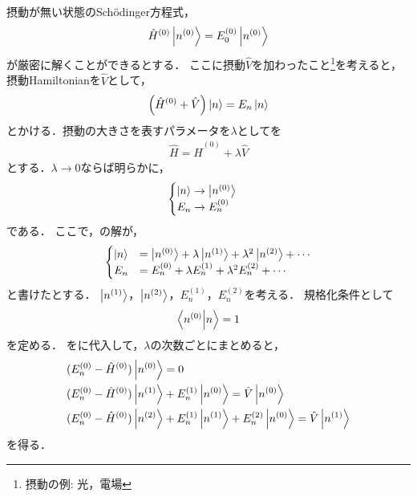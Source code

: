 \documentclass{report}
\begin{document}
  摂動が無い状態のSch\"odinger方程式，
  \begin{equation}
    \hat{H}^{(0)}\ket{n^{(0)}}=E_0^{(0)}\ket{n^{(0)}}
  \end{equation}
  が厳密に解くことができるとする．
  ここに摂動$\hat{V}$を加わったこと\footnote{摂動の例: 光，電場}を考えると，摂動Hamiltonianを$\hat{V}$として，
  \begin{equation}
    \qty(\hat{H}^{(0)} + \hat{V})\ket{n} = E_n\ket{n}\label{perturbation-origin}
  \end{equation}
  とかける．摂動の大きさを表すパラメータを$\lambda$としてを
  \begin{align}
    \hat{H} = \hat{H}^{(0)} + \lambda\hat{V}\label{perturbation-using-lambda}
  \end{align}
  とする．$\lambda\to 0$ならば明らかに，
  \begin{equation}
    \begin{cases}
      \ket{n}\to\ket{n^{(0)}}\\
      E_n\to E_n^{(0)}
    \end{cases}
  \end{equation}
  である．
  ここで，の解が，%
  \begin{equation}
    \begin{cases}
      \ket{n} &= \ket{n^{(0)}} + \lambda\ket{n^{(1)}} + \lambda^2\ket{n^{(2)}} + \cdots \label{n-en-expantion} \\
      E_n &= E_n^{(0)} + \lambda E_n^{(1)} + \lambda^2 E_n^{(2)} + \cdots 
    \end{cases}
  \end{equation}
  と書けたとする．
  $\ket{n^{(1)}}$，$\ket{n^{(2)}}$，$E_n^{(1)}$，$E_n^{(2)}$を考える．
  規格化条件として
  \begin{equation}
    \braket{n^{(0)}}{n} = 1
  \end{equation}
  を定める．
  をに代入して，$\lambda$の次数ごとにまとめると，
  \begin{align}
    &(E_n^{(0)} - \hat{H}^{(0)})\ket{n^{(0)}} = 0 \label{1st} \\ 
    &(E_n^{(0)} - \hat{H}^{(0)})\ket{n^{(1)}} + E_n^{(1)}\ket{n^{(0)}} = \hat{V}\ket{n^{(0)}}\label{2nd}\\
    &(E_n^{(0)} - \hat{H}^{(0)})\ket{n^{(2)}} + E_n^{(1)}\ket{n^{(1)}} + E_n^{(2)}\ket{n^{(0)}} = \hat{V}\ket{n^{(1)}}\\
  \end{align}
  を得る．
\end{document}
